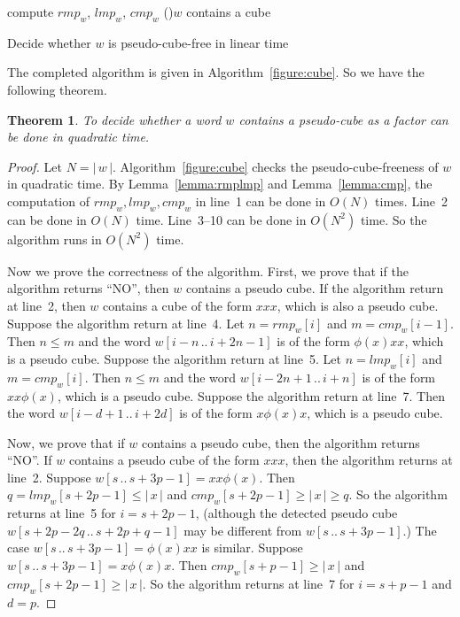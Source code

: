 \documentclass[12pt]{article}
\def\abs#1{{|\,#1\,|}}
\newtheorem{theorem}{Theorem}
\begin{document}
\begin{algorithm}
  \SetLine {}
  \linesnumbered
  compute $rmp_w$, $lmp_w$, $cmp_w$\;
  \lIf(){$w$ contains a cube}{}
  \;
  \caption{Decide whether $w$ is pseudo-cube-free in linear time}
  \label{figure:cube}
\end{algorithm}
The completed algorithm is given in Algorithm~\ref{figure:cube}. So
we have the following theorem.
\begin{theorem}
To decide whether a word $w$ contains a pseudo-cube as a factor can
be done in quadratic time.
\end{theorem}
\begin{proof}
Let $N=\abs{w}$. Algorithm~\ref{figure:cube} checks the
pseudo-cube-freeness of $w$ in quadratic time. By
Lemma~\ref{lemma:rmplmp} and Lemma~\ref{lemma:cmp}, the computation
of $rmp_w, lmp_w, cmp_w$ in line~1 can be done in $O(N)$ times.
Line~2 can be done in $O(N)$ time. Line~3--10 can be done in
$O(N^2)$ time. So the algorithm runs in $O(N^2)$ time.

Now we prove the correctness of the algorithm. First, we prove that
if the algorithm returns ``NO'', then $w$ contains a pseudo cube. If
the algorithm return at line~2, then $w$ contains a cube of the form
$xxx$, which is also a pseudo cube. Suppose the algorithm return at
line~4. Let $n=rmp_w[i]$ and $m=cmp_w[i-1]$. Then $n\leq m$ and the
word $w[i-n\,..\,i+2n-1]$ is of the form $\phi(x)xx$, which is a
pseudo cube. Suppose the algorithm return at line~5. Let
$n=lmp_w[i]$ and $m=cmp_w[i]$. Then $n\leq m$ and the word
$w[i-2n+1\,..\,i+n]$ is of the form $xx\phi(x)$, which is a pseudo
cube. Suppose the algorithm return at line~7. Then the word
$w[i-d+1\,..\,i+2d]$ is of the form $x\phi(x)x$, which is a pseudo
cube.

Now, we prove that if $w$ contains a pseudo cube, then the algorithm
returns ``NO''. If $w$ contains a pseudo cube of the form $xxx$,
then the algorithm returns at line~2. Suppose
$w[s\,..\,s+3p-1]=xx\phi(x)$. Then $q=lmp_w[s+2p-1]\leq\abs{x}$ and
$cmp_w[s+2p-1]\geq\abs{x}\geq q$. So the algorithm returns at line~5
for $i=s+2p-1$, (although the detected pseudo cube
$w[s+2p-2q\,..\,s+2p+q-1]$ may be different from
$w[s\,..\,s+3p-1]$.) The case $w[s\,..\,s+3p-1]=\phi(x)xx$ is
similar. Suppose $w[s\,..\,s+3p-1]=x\phi(x)x$. Then
$cmp_w[s+p-1]\geq\abs{x}$ and $cmp_w[s+2p-1]\geq\abs{x}$. So the
algorithm returns at line~7 for $i=s+p-1$ and $d=p$.
\end{proof}
\end{document}
